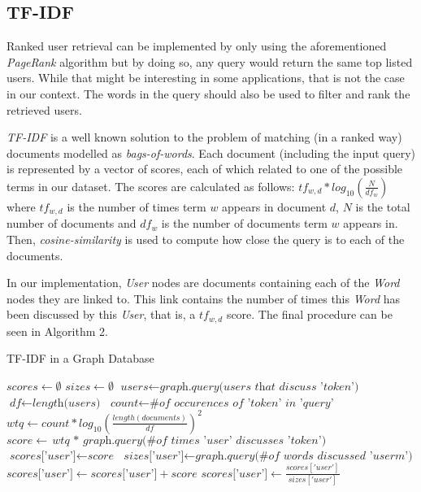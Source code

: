 \subsection{TF-IDF}

Ranked user retrieval can be implemented by only using the aforementioned \emph{PageRank} algorithm but by doing so, any query would return the same top listed users. While that might be interesting in some applications, that is not the case in our context. The words in the query should also be used to filter and rank the retrieved users.

\emph{TF-IDF} is a well known solution to the problem of matching (in a ranked way) documents modelled as \emph{bags-of-words}. Each document (including the input query) is represented by a vector of scores, each of which related to one of the possible terms in our dataset. The scores are calculated as follows: ${tf}_{w, d} * log_{10}(\frac{N}{{df}_{w}})$ where ${tf}_{w, d}$ is the number of times term $w$ appears in document $d$, $N$ is the total number of documents and ${df}_{w}$ is the number of documents term $w$ appears in. Then, \emph{cosine-similarity} is used to compute how close the query is to each of the documents.

In our implementation, \emph{User} nodes are documents containing each of the \emph{Word} nodes they are linked to. This link contains the number of times this \emph{Word} has been discussed by this \emph{User}, that is, a ${tf}_{w, d}$ score. The final procedure can be seen in Algorithm 2.

\begin{algorithm}
\caption{TF-IDF in a Graph Database}\label{alg:tfidf}
\begin{algorithmic}[1]
    \State $\textit{scores} \gets \emptyset$
    \State $\textit{sizes} \gets \emptyset$
        \State $\textit{users} \gets \textit{graph.query(users that discuss 'token')}$
        \State $\textit{df} \gets \textit{length(users)}$
        \State $\textit{count} \gets \textit{\# of occurences of 'token' in 'query'}$
        \State $\textit{wtq} \gets \textit{$count * log_{10}(\frac{length(documents)}{df})^2$}$
            \State $\textit{score} \gets \textit{wtq $*$ graph.query(\# of times 'user' discusses 'token')}$
                \State $\textit{scores['user']} \gets \textit{score}$
                \State $\textit{sizes['user']} \gets \textit{graph.query(\# of words discussed 'userm')}$
            \Else
                \State $\textit{scores['user']} \gets \textit{scores['user']} + \textit{score}$
            \EndIf       
        \EndFor
    \EndFor
        \State $\textit{scores['user']} \gets \textit{$\frac{scores['user']}{sizes['user']}$}$
    \EndFor
    \State {}
\EndProcedure
\end{algorithmic}
\end{algorithm}